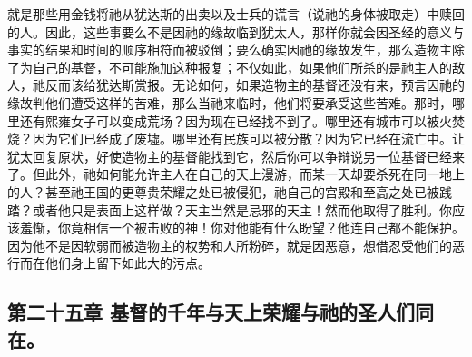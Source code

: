 就是那些用金钱将祂从犹达斯的出卖以及士兵的谎言（说祂的身体被取走）中赎回的人。因此，这些事要么不是因祂的缘故临到犹太人，那样你就会因圣经的意义与事实的结果和时间的顺序相符而被驳倒；要么确实因祂的缘故发生，那么造物主除了为自己的基督，不可能施加这种报复；不仅如此，如果他们所杀的是祂主人的敌人，祂反而该给犹达斯赏报。无论如何，如果造物主的基督还没有来，预言因祂的缘故判他们遭受这样的苦难，那么当祂来临时，他们将要承受这些苦难。那时，哪里还有熙雍女子可以变成荒场？因为现在已经找不到了。哪里还有城市可以被火焚烧？因为它们已经成了废墟。哪里还有民族可以被分散？因为它已经在流亡中。让犹太回复原状，好使造物主的基督能找到它，然后你可以争辩说另一位基督已经来了。但此外，祂如何能允许主人在自己的天上漫游，而某一天却要杀死在同一地上的人？甚至祂王国的更尊贵荣耀之处已被侵犯，祂自己的宫殿和至高之处已被践踏？或者他只是表面上这样做？天主当然是忌邪的天主！然而他取得了胜利。你应该羞惭，你竟相信一个被击败的神！你对他能有什么盼望？他连自己都不能保护。因为他不是因软弱而被造物主的权势和人所粉碎，就是因恶意，想借忍受他们的恶行而在他们身上留下如此大的污点。\par


\subsection{第二十五章 基督的千年与天上荣耀与祂的圣人们同在。}


